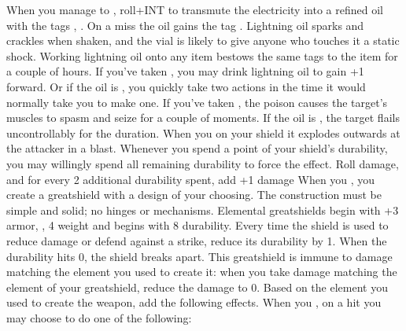 \documentclass[darkmode]{dw_playbook}
\begin{document}
\pageThree
    {
        \advancedMovesCont
    }
    {
            {When you manage to , roll+INT to transmute the electricity into a refined oil with the tags , .  On a miss the oil gains the tag .  Lightning oil sparks and crackles when shaken, and the vial is likely to give anyone who touches it a static shock.  Working lightning oil onto any item bestows the same tags to the item for a couple of hours.
            \gap
            If you’ve taken , you may drink lightning oil to gain +1 forward.  Or if the oil is , you quickly take two actions in the time it would normally take you to make one.
            \gap
            If you’ve taken , the poison causes the target’s muscles to spasm and seize for a couple of moments.  If the oil is , the target flails uncontrollably for the duration.}
        \gap
            {When you  on your shield it explodes outwards at the attacker in a  blast.
            \gap
            Whenever you spend a point of your shield’s durability, you may willingly spend all remaining durability to force the effect.  Roll damage, and for every 2 additional durability spent, add +1 damage}
            {When you , you create a greatshield with a design of your choosing.  The construction must be simple and solid; no hinges or mechanisms.  Elemental greatshields begin with +3 armor, , 4 weight and begins with 8 durability.
            \gap
            Every time the shield is used to reduce damage or defend against a strike, reduce its durability by 1.  When the durability hits 0, the shield breaks apart.  This greatshield is immune to damage matching the element you used to create it: when you take damage matching the element of your greatshield, reduce the damage to 0.
            \gap
            Based on the element you used to create the weapon, add the following effects.
            \gapSm
            \gapSm
            \gapSm
            \gapSm
            }
        \gap
            {
            When you , on a hit you may choose to do one of the following:
            \gapSm
            \gapSm
            }
    }
\end{document}
